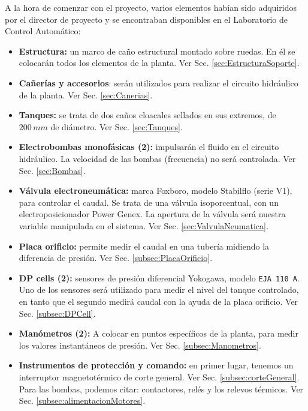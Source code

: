 A la hora de comenzar con el proyecto, varios elementos habían
sido adquiridos por el director de proyecto y se encontraban
disponibles en el Laboratorio de Control Automático:
\begin{itemize}
  \item \textbf{Estructura:} un marco de caño estructural montado sobre
  ruedas. En él se colocarán todos los elementos de la planta.
  Ver Sec. \ref{sec:EstructuraSoporte}.

  \item \textbf{Cañerías y accesorios}: serán utilizados para realizar el
  circuito hidráulico de la planta. Ver Sec. \ref{sec:Canerias}.

  \item \textbf{Tanques:} se trata de dos caños cloacales sellados en sus
  extremos, de $200\,mm$ de diámetro. Ver Sec. \ref{sec:Tanques}.

  \item \textbf{Electrobombas monofásicas (2):} impulsarán el fluido
  en el circuito hidráulico.
  La velocidad de las bombas (frecuencia) no será controlada.
  Ver Sec. \ref{sec:Bombas}.

  \item \textbf{Válvula electroneumática:} marca Foxboro, modelo
  Stabilflo (serie V1), para controlar el caudal.
  Se trata de una válvula isoporcentual, con un electroposicionador
  Power Genex.
  La apertura de la válvula será nuestra variable manipulada en
  el sistema.
  Ver Sec. \ref{sec:ValvulaNeumatica}.

  \item \textbf{Placa orificio:} permite medir el
  caudal en una tubería midiendo la diferencia de presión.
  Ver Sec. \ref{subsec:PlacaOrificio}.

  \item \textbf{DP cells (2):} sensores de presión
  diferencial Yokogawa, modelo \verb|EJA 110 A|.
  Uno de los sensores será utilizado para medir el nivel del tanque controlado,
  en tanto que el segundo medirá caudal con la ayuda de la placa orificio.
  Ver Sec. \ref{subsec:DPCell}.

  \item \textbf{Manómetros (2):} A colocar en
  puntos específicos de la planta, para medir los valores instantáneos de
  presión.
  Ver Sec. \ref{subsec:Manometros}.

  \item \textbf{Instrumentos de protección y comando:}
  en primer lugar, tenemos un interruptor magnetotérmico de corte general.
  Ver Sec. \ref{subsec:corteGeneral}.
  Para las bombas, podemos citar: contactores, relés y los relevos térmicos.
  Ver Sec. \ref{subsec:alimentacionMotores}.


\end{itemize}
